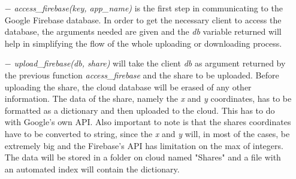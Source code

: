 \documentclass[12pt, a4paper, oneside]{book}
\begin{document}
    \vspace{-0.5cm}
    \begin{itemize}
        \item[$-$] {\it access\_firebase(key, app\_name)} is the first step in communicating to the Google Firebase database. In order to get the necessary client to access the database, the arguments needed are given and the {\it db} variable returned will help in simplifying the flow of the whole uploading or downloading process.
    \end{itemize}
    \vspace{-0.5cm}
    \begin{itemize}
        \item[$-$] {\it upload\_firebase(db, share)} will take the client {\it db} as argument returned by the previous function {\it access\_firebase} and the share to be uploaded. Before uploading the share, the cloud database will be erased of any other information. The data of the share, namely the {\it x} and {\it y} coordinates, has to be formatted as a dictionary and then uploaded to the cloud. This has to do with Google's own API. Also important to note is that the shares coordinates have to be converted to string, since the {\it x} and {\it y} will, in most of the cases, be extremely big and the Firebase's API has limitation on the max of integers. The data will be stored in a folder on cloud named "Shares" and a file with an automated index will contain the dictionary.
    \end{itemize}
\end{document}
